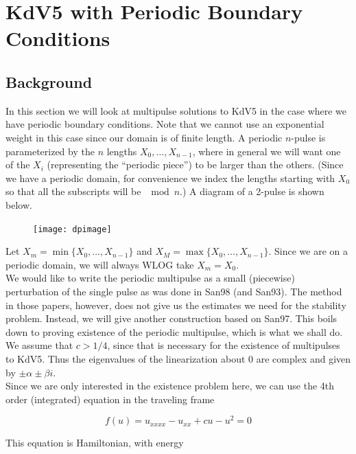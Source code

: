 \documentclass[12pt]{article}
\begin{document}
\section{KdV5 with Periodic Boundary Conditions}

\subsection{Background}

In this section we will look at multipulse solutions to KdV5 in the case where we have periodic boundary conditions. Note that we cannot use an exponential weight in this case since our domain is of finite length. A periodic $n$-pulse is parameterized by the $n$ lengths $X_0, \dots, X_{n-1}$, where in general we will want one of the $X_i$ (representing the ``periodic piece'') to be larger than the others. (Since we have a periodic domain, for convenience we index the lengths starting with $X_0$ so that all the subscripts will be $\mod n$.) A diagram of a 2-pulse is shown below.

\begin{figure}[H]
\texttt{[image: dpimage]}
\end{figure}

Let $X_m = \min \{ X_0, \dots, X_{n-1} \}$ and $X_M = \max \{ X_0, \dots, X_{n-1} \}$. Since we are on a periodic domain, we will always WLOG take $X_m = X_0$.\\

We would like to write the periodic multipulse as a small (piecewise) perturbation of the single pulse as was done in San98 (and San93). The method in those papers, however, does not give us the estimates we need for the stability problem. Instead, we will give another construction based on San97. This boils down to proving existence of the periodic multipulse, which is what we shall do. We assume that $c > 1/4$, since that is necessary for the existence of multipulses to KdV5. Thus the eigenvalues of the linearization about $0$ are complex and given by $\pm \alpha \pm \beta i$.\\

Since we are only interested in the existence problem here, we can use the 4th order (integrated) equation in the traveling frame

\begin{equation}\label{4thorder}
f(u) = u_{xxxx} - u_{xx} + c u - u^2 = 0
\end{equation}

This equation is Hamiltonian, with energy 
\end{document}
